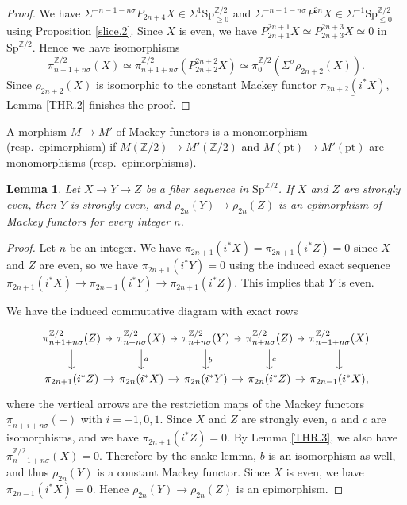 \documentclass[10pt]{amsart}
\newtheorem{lem}[thm]{Lemma}
\theoremstyle{definition}
\numberwithin{equation}{section}
\newcommand{\Z}{\mathbb{Z}}
\newcommand{\ul}{\underline}
\newcommand{\pt}{\mathrm{pt}}
\newcommand{\Sp}{\mathrm{Sp}}
\begin{document}
{\begin{proof}
We have $\Sigma^{-n-1-n\sigma}P_{2n+4}X\in \Sigma^1 \Sp_{\geq 0}^{\Z/2}$ and $\Sigma^{-n-1-n\sigma}P^{2n}X\in \Sigma^{-1}\Sp_{\leq 0}^{\Z/2}$
using Proposition \ref{slice.2}.
Since $X$ is even,
we have $P_{2n+1}^{2n+1}X\simeq P_{2n+3}^{2n+3}X\simeq 0$ in $\Sp^{\Z/2}$.
Hence we have isomorphisms
\[
\pi_{n+1+n\sigma}^{\Z/2}(X)
\simeq
\pi_{n+1+n\sigma}^{\Z/2}(P_{2n+2}^{2n+2}X)
\simeq
\pi_{0}^{\Z/2}(\Sigma^\sigma\rho_{2n+2}(X)).
\]
Since $\rho_{2n+2}(X)$ is isomorphic to the constant Mackey functor $\ul{\pi_{2n+2}(i^*X)}$,
Lemma \ref{THR.2} finishes the proof.
\end{proof}

A morphism $M\to M'$ of Mackey functors is a monomorphism (resp.\ epimorphism) if $M(\Z/2)\to M'(\Z/2)$ and $M(\pt)\to M'(\pt)$ are monomorphisms (resp.\ epimorphisms).

\begin{lem}
\label{THR.4}
Let $X\to Y\to Z$ be a fiber sequence in $\Sp^{\Z/2}$.
If $X$ and $Z$ are strongly even,
then $Y$ is strongly even,
and $\rho_{2n}(Y)\to \rho_{2n}(Z)$ is an epimorphism of Mackey functors for every integer $n$.
\end{lem}
\begin{proof}
Let $n$ be an integer.
We have $\pi_{2n+1}(i^*X)=\pi_{2n+1}(i^*Z)=0$ since $X$ and $Z$ are even,
so we have $\pi_{2n+1}(i^*Y)=0$ using the induced exact sequence $\pi_{2n+1}(i^*X)\to \pi_{2n+1}(i^*Y)\to \pi_{2n+1}(i^*Z)$.
This implies that $Y$ is even.

We have the induced commutative diagram with exact rows
\[
\begin{tikzcd}[column sep=tiny]
\pi_{n+1+n\sigma}^{\Z/2}(Z)\ar[r]\ar[d]&
\pi_{n+n\sigma}^{\Z/2}(X)\ar[r]\ar[d,"a"]&
\pi_{n+n\sigma}^{\Z/2}(Y)\ar[r]\ar[d,"b"]&
\pi_{n+n\sigma}^{\Z/2}(Z)\ar[r]\ar[d,"c"]&
\pi_{n-1+n\sigma}^{\Z/2}(X)\ar[d]
\\
\pi_{2n+1}(i^*Z)\ar[r]&
\pi_{2n}(i^*X)\ar[r]&
\pi_{2n}(i^*Y)\ar[r]&
\pi_{2n}(i^*Z)\ar[r]&
\pi_{2n-1}(i^*X),
\end{tikzcd}
\]
where the vertical arrows are the restriction maps of the Mackey functors $\ul{\pi}_{n+i+n\sigma}(-)$ with $i=-1,0,1$.
Since $X$ and $Z$ are strongly even,
$a$ and $c$ are isomorphisms,
and we have $\pi_{2n+1}(i^*Z)=0$.
By Lemma \ref{THR.3},
we also have $\pi_{n-1+n\sigma}^{\Z/2}(X)=0$.
Therefore by the snake lemma, $b$ is an isomorphism as well, and thus $\rho_{2n}(Y)$ is a constant Mackey functor.
Since $X$ is even,
we have $\pi_{2n-1}(i^*X)=0$.
Hence $\rho_{2n}(Y)\to \rho_{2n}(Z)$ is an epimorphism.
\end{proof}

}
\end{document}
